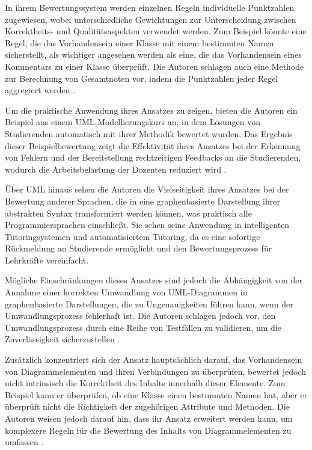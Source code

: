 In ihrem Bewertungssystem werden einzelnen Regeln individuelle Punktzahlen zugewiesen, wobei unterschiedliche Gewichtungen zur Unterscheidung zwischen Korrektheits- und Qualitätsaspekten verwendet werden. Zum Beispiel könnte eine Regel, die das Vorhandensein einer Klasse mit einem bestimmten Namen sicherstellt, als wichtiger angesehen werden als eine, die das Vorhandensein eines Kommentars zu einer Klasse überprüft. Die Autoren schlagen auch eine Methode zur Berechnung von Gesamtnoten vor, indem die Punktzahlen jeder Regel aggregiert werden \cite{striewe2011automated}.

Um die praktische Anwendung ihres Ansatzes zu zeigen, bieten die Autoren ein Beispiel aus einem UML-Modellierungskurs an, in dem Lösungen von Studierenden automatisch mit ihrer Methodik bewertet wurden. Das Ergebnis dieser Beispielbewertung zeigt die Effektivität ihres Ansatzes bei der Erkennung von Fehlern und der Bereitstellung rechtzeitigen Feedbacks an die Studierenden, wodurch die Arbeitsbelastung der Dozenten reduziert wird \cite{striewe2011automated}.

Über UML hinaus sehen die Autoren die Vielseitigkeit ihres Ansatzes bei der Bewertung anderer Sprachen, die in eine graphenbasierte Darstellung ihrer abstrakten Syntax transformiert werden können, was praktisch alle Programmiersprachen einschließt. Sie sehen seine Anwendung in intelligenten Tutoringsystemen und automatisiertem Tutoring, da es eine sofortige Rückmeldung an Studierende ermöglicht und den Bewertungsprozess für Lehrkräfte vereinfacht.

Mögliche Einschränkungen dieses Ansatzes sind jedoch die Abhängigkeit von der Annahme einer korrekten Umwandlung von UML-Diagrammen in graphenbasierte Darstellungen, die zu Ungenauigkeiten führen kann, wenn der Umwandlungsprozess fehlerhaft ist. Die Autoren schlagen jedoch vor, den Umwandlungsprozess durch eine Reihe von Testfällen zu validieren, um die Zuverlässigkeit sicherzustellen \cite{striewe2011automated}.

Zusätzlich konzentriert sich der Ansatz hauptsächlich darauf, das Vorhandensein von Diagrammelementen und ihren Verbindungen zu überprüfen, bewertet jedoch nicht intrinsisch die Korrektheit des Inhalts innerhalb dieser Elemente. Zum Beispiel kann er überprüfen, ob eine Klasse einen bestimmten Namen hat, aber er überprüft nicht die Richtigkeit der zugehörigen Attribute und Methoden. Die Autoren weisen jedoch darauf hin, dass ihr Ansatz erweitert werden kann, um komplexere Regeln für die Bewertung des Inhalts von Diagrammelementen zu umfassen \cite{striewe2014automated}.

